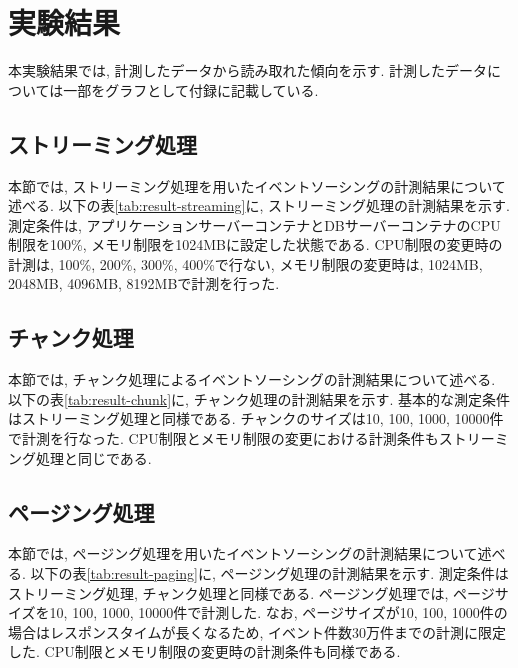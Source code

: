 \documentclass[../../main]{subfiles}
\begin{document}
    \section{実験結果}\label{sec:result}

    本実験結果では, 計測したデータから読み取れた傾向を示す. 計測したデータについては一部をグラフとして付録に記載している.

    \subsection{ストリーミング処理}\label{subsec:result-streaming}

    本節では, ストリーミング処理を用いたイベントソーシングの計測結果について述べる. 以下の表\ref{tab:result-streaming}に, ストリーミング処理の計測結果を示す. 測定条件は, アプリケーションサーバーコンテナとDBサーバーコンテナのCPU制限を100\%, メモリ制限を1024MBに設定した状態である. CPU制限の変更時の計測は, 100\%, 200\%, 300\%, 400\%で行ない, メモリ制限の変更時は, 1024MB, 2048MB, 4096MB, 8192MBで計測を行った.

    

    \subsection{チャンク処理}\label{subsec:result-chunk}

    本節では, チャンク処理によるイベントソーシングの計測結果について述べる. 以下の表\ref{tab:result-chunk}に, チャンク処理の計測結果を示す. 基本的な測定条件はストリーミング処理と同様である. チャンクのサイズは10, 100, 1000, 10000件で計測を行なった. CPU制限とメモリ制限の変更における計測条件もストリーミング処理と同じである.

    

    \subsection{ページング処理}\label{subsec:result-paging}

    本節では, ページング処理を用いたイベントソーシングの計測結果について述べる. 以下の表\ref{tab:result-paging}に, ページング処理の計測結果を示す. 測定条件はストリーミング処理, チャンク処理と同様である. ページング処理では, ページサイズを10, 100, 1000, 10000件で計測した. なお, ページサイズが10, 100, 1000件の場合はレスポンスタイムが長くなるため, イベント件数30万件までの計測に限定した. CPU制限とメモリ制限の変更時の計測条件も同様である.
\end{document}
